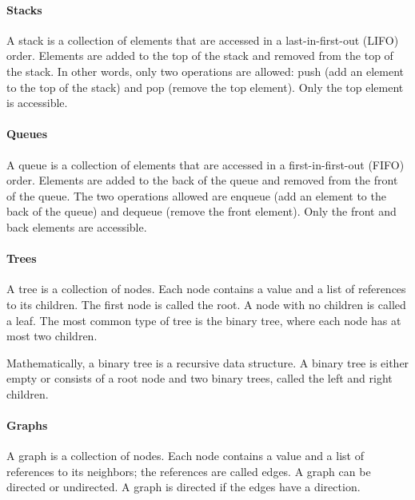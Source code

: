
\paragraph{Stacks}  A stack is a collection of elements that are accessed in a
last-in-first-out (LIFO) order.  Elements are added to the top of the stack and
removed from the top of the stack.  In other words, only two operations are
allowed: push (add an element to the top of the stack) and pop (remove the top element).
Only the top element is accessible.

\paragraph{Queues}  A queue is a collection of elements that are accessed in a
first-in-first-out (FIFO) order.  Elements are added to the back of the queue and
removed from the front of the queue.  The two operations allowed are enqueue (add an
element to the back of the queue) and dequeue (remove the front element).  Only the
front and back elements are accessible.

\paragraph{Trees}  A tree is a collection of nodes.  Each node contains a value and a
list of references to its children.  The first node is called the root.  A node with
no children is called a leaf.  The most common type of tree is the binary tree, where
each node has at most two children.

Mathematically, a binary tree is a recursive data structure.  A binary tree is either
empty or consists of a root node and two binary trees, called the left and right
children.

\paragraph{Graphs}  A graph is a collection of nodes.  Each node contains a value and a
list of references to its neighbors; the references are called edges.  A graph can be
directed or undirected.  A graph is directed if the edges have a direction.

